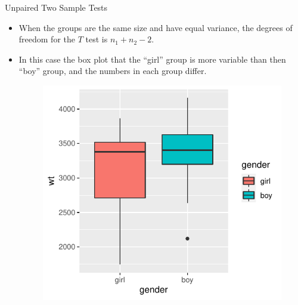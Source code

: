 \documentclass[handout]{beamer}
\begin{document}
\begin{frame}{Unpaired Two Sample Tests}
 \scriptsize{

\begin{itemize}
 
 \item When the groups are the same size and have equal variance, the degrees of freedom for the $T$ test is  $n_1+n_2-2$.
 
  \item In this case the box plot that the ``girl'' group is more variable than then ``boy'' group, and the numbers in each group differ.
 
 
  \begin{figure}[h!]
	\centering
	\includegraphics[scale=0.55]{pics/boxplotgender.pdf}
\end{figure}

 
\end{itemize}



}
\end{frame}
\end{document}
